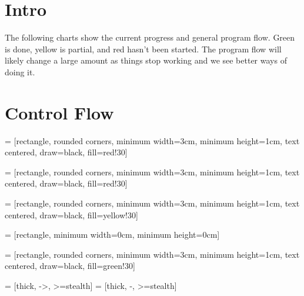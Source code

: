 \documentclass[a4paper,10pt]{article}
\begin{document}
\section{Intro}
The following charts show the current progress and general program flow.
Green is done, yellow is partial, and red hasn't been started. The program
flow will likely change a large amount as things stop working and we see
better ways of doing it.

\break

\section{Control Flow}
 =
	[rectangle,
	rounded corners,
	minimum width=3cm,
	minimum height=1cm,
	text centered,
	draw=black,
	fill=red!30]

 =
	[rectangle,
	rounded corners,
	minimum width=3cm,
	minimum height=1cm,
	text centered,
	draw=black,
	fill=red!30]

 =
	[rectangle,
	rounded corners,
	minimum width=3cm,
	minimum height=1cm,
	text centered,
	draw=black,
	fill=yellow!30]

 =
	[rectangle,
	minimum width=0cm,
	minimum height=0cm]

 =
	[rectangle,
	rounded corners,
	minimum width=3cm,
	minimum height=1cm,
	text centered,
	draw=black,
	fill=green!30]

 =
	[thick,
	->,
	>=stealth]
 =
	[thick,
	-,
	>=stealth]
\end{document}
